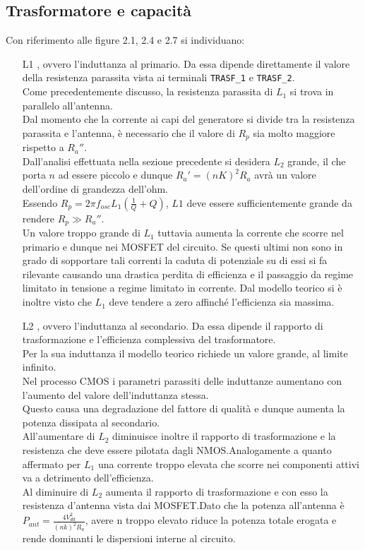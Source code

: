 \documentclass[a4paper, 12pt]{memoir}
\begin{document}
\subsection{Trasformatore e capacità}
Con riferimento alle figure 2.1, 2.4 e 2.7 si individuano:
\begin{enumerate}
\item[L1], ovvero l'induttanza al primario. Da essa dipende direttamente il
	valore della resistenza parassita vista ai terminali \texttt{TRASF\_1} e
	\texttt{TRASF\_2}.\\
	Come precedentemente discusso, la resistenza parassita di $L_1$ si trova
	in parallelo all'antenna.\\
	Dal momento che la corrente ai capi del generatore si divide tra la
	resistenza parassita e l'antenna, è necessario che il valore di $R_p$ sia
	molto maggiore rispetto a $R_a''$.\\
	Dall'analisi effettuata nella sezione precedente si desidera $L_2$ 
	grande, il che porta $n$ ad essere piccolo e dunque $R_a' = {(nK)}^2R_a$
	avrà un valore dell'ordine di grandezza dell'ohm.\\
	Essendo $R_p = 2\pi f_{osc} L_1 \left(\frac{1}{Q} + Q \right)$, $L1$ deve
	essere sufficientemente grande da rendere $R_p \gg R_a''$.\\
	Un valore troppo grande di $L_1$ tuttavia aumenta la corrente che scorre
	nel primario e dunque nei MOSFET del circuito. Se questi ultimi non sono
	in grado di sopportare tali correnti la caduta di potenziale su di essi
	si fa rilevante causando una drastica perdita di efficienza e il
	passaggio da regime limitato in tensione a regime limitato in corrente.
	Dal modello teorico si è inoltre visto che $L_1$ deve tendere a zero
	affinché l'efficienza sia massima.

\item[L2], ovvero l'induttanza al secondario. Da essa dipende il rapporto di
	trasformazione e l'efficienza complessiva del trasformatore.\\
	Per la sua induttanza il modello teorico richiede un valore grande, al
	limite infinito.\\
	Nel processo CMOS i parametri parassiti delle induttanze aumentano con
	l'aumento del valore dell'induttanza stessa\cite{RazaviRF}.\\
	Questo causa una degradazione del fattore di qualità e dunque aumenta la
	potenza dissipata al secondario.\\
	All'aumentare di $L_2$ diminuisce inoltre il rapporto di trasformazione e
      la resistenza che deve essere pilotata dagli NMOS.\@ Analogamente a
      quanto affermato per $L_1$ una corrente troppo elevata che scorre nei
      componenti attivi va a detrimento dell'efficienza.\\
	Al diminuire di $L_2$ aumenta il rapporto di trasformazione e con esso la
	resistenza d'antenna vista dai MOSFET.\@ Dato che la potenza all'antenna è
	$P_{ant}= \frac{4V_{dd}^2}{(nk)^2R_a}$, avere n troppo elevato riduce la
	potenza totale erogata e rende dominanti le dispersioni interne al
	circuito.


\end{enumerate}
\end{document}
